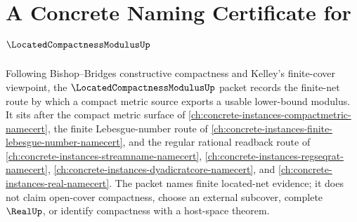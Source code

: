 \chapter{A Concrete Naming Certificate for $\LocatedCompactnessModulusUp$}
\label{ch:concrete-instances-located-compactness-modulus-namecert}

Following Bishop--Bridges constructive compactness and Kelley's finite-cover viewpoint, the $\LocatedCompactnessModulusUp$ packet records the finite-net route by which a compact metric source exports a usable lower-bound modulus. It sits after the compact metric surface of \autoref{ch:concrete-instances-compactmetric-namecert}, the finite Lebesgue-number route of \autoref{ch:concrete-instances-finite-lebesgue-number-namecert}, and the regular rational readback route of \autoref{ch:concrete-instances-streamname-namecert}, \autoref{ch:concrete-instances-regseqrat-namecert}, \autoref{ch:concrete-instances-dyadicratcore-namecert}, and \autoref{ch:concrete-instances-real-namecert}. The packet names finite located-net evidence; it does not claim open-cover compactness, choose an external subcover, complete $\RealUp$, or identify compactness with a host-space theorem.

